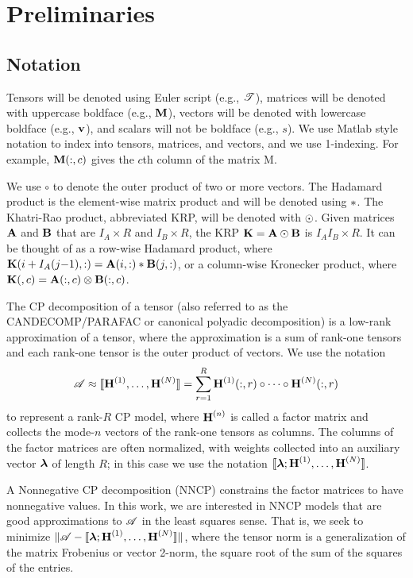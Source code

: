 
\section{Preliminaries} 
\label{sec:prelims}

\subsection{Notation}

Tensors will be denoted using Euler script (e.g., $\T{T}$), 
matrices will be denoted with uppercase boldface (e.g., $\M{M}$), vectors will be denoted with lowercase boldface  
(e.g., $\V{v}$), and scalars will not be boldface (e.g., $s$). 
We use Matlab style notation to index into tensors, matrices, and vectors, and we use 1-indexing. 
For example, $\M{M}(:,c)$ gives the $c$th column of the matrix M.

We use $\circ$ to denote the outer product of two or more vectors.
The Hadamard product is the element-wise matrix product and will be denoted using $\ast$. 
The Khatri-Rao product, abbreviated KRP, will be denoted with $\odot$. 
Given matrices $\M{A}$ and $\M{B}$ that are $I_{A} \times R$ and $I_{B} \times R$, the KRP $\M{K} = \M{A} \Khat \M{B}$ is $I_{A}I_{B} \times R$. 
It can be thought of as a row-wise Hadamard product, where $\M{K}(i+I_{A}(j{-}1),:) = \M{A}(i,:) \Hada \M{B}(j,:)$, or a column-wise Kronecker product, where $\M{K}(,c) =  \M{A}(:,c) \Kron \M{B}(:,c)$.

The CP decomposition of a tensor (also referred to as the CANDECOMP/PARAFAC or canonical polyadic decomposition) is a low-rank approximation of a tensor, where the approximation is a sum of rank-one tensors and each rank-one tensor is the outer product of vectors.
We use the notation
$$\TA \approx \CP = \sum_{r=1}^R \Mn{H}{1}(:,r) \circ \cdots \circ \Mn{H}{N}(:,r)$$
to represent a rank-$R$ CP model, where $\Mn{H}{n}$ is called a factor matrix and collects the mode-$n$ vectors of the rank-one tensors as columns.
The columns of the factor matrices are often normalized, with weights collected into an auxiliary vector $\V{\lambda}$ of length $R$; in this case we use the notation $\CPl$.

A Nonnegative CP decomposition (NNCP) constrains the factor matrices to have nonnegative values.
In this work, we are interested in NNCP models that are good approximations to $\TA$ in the least squares sense.
That is, we seek to minimize $\|\TA-\CPl\|$, where the tensor norm is a generalization of the matrix Frobenius or vector 2-norm, the square root of the sum of the squares of the entries.

